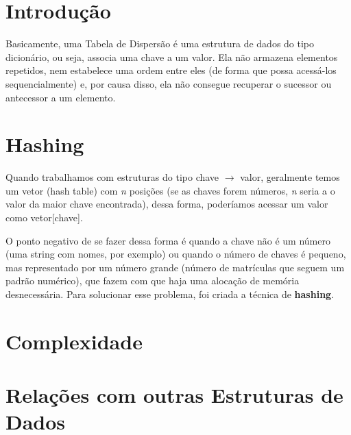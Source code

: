 \documentclass[12pt,openright,oneside,a4paper,english,brazil]{abntex2}
\begin{document}
\imprimircapa

\section*{Introdução}
    Basicamente, uma Tabela de Dispersão é uma estrutura de dados do tipo dicionário, ou seja, associa uma chave a um valor. Ela não armazena elementos repetidos, nem estabelece uma ordem entre eles (de forma que possa acessá-los sequencialmente) e, por causa disso, ela não consegue recuperar o sucessor ou antecessor a um elemento.

\section*{Hashing}
    Quando trabalhamos com estruturas do tipo chave $\rightarrow$ valor, geralmente temos um vetor (hash table) com \textit{n} posições (se as chaves forem números, \textit{n} seria a o valor da maior chave encontrada), dessa forma, poderíamos acessar um valor como vetor[chave].

    O ponto negativo de se fazer dessa forma é quando a chave não é um número (uma string com nomes, por exemplo) ou quando o número de chaves é pequeno, mas representado por um número grande (número de matrículas que seguem um padrão numérico), que fazem com que haja uma alocação de memória desnecessária. Para solucionar esse problema, foi criada a técnica de \textbf{hashing}.

\section*{Complexidade}

\section*{Relações com outras Estruturas de Dados}
\end{document}
